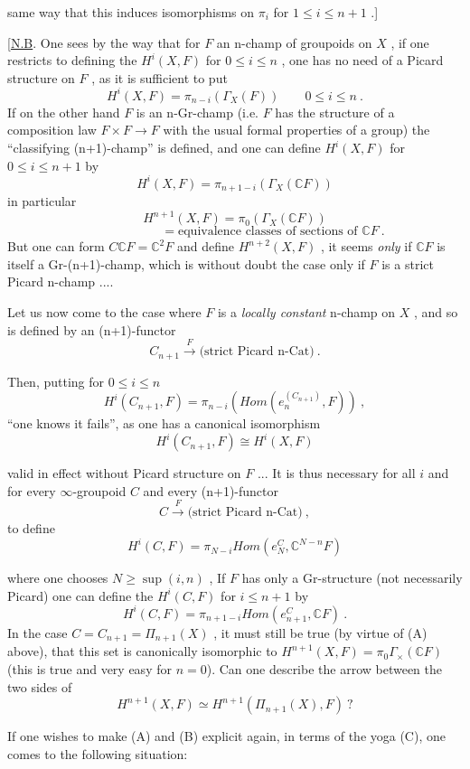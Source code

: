 
same way that this induces isomorphisms on $\pi_i$ for $1 \leq i \leq n + 1$ .]

[\uline{N.B}. One sees by the way that for $F$ an n-champ of groupoids on $X$ ,
if one restricts to defining the $H^i(X, F)$ for $0 \leq i \leq n$ , one has no need
of a Picard structure on $F$ , as it is sufficient to put
\[ H^i(X, F) = \pi_{n-i}(\Gamma_X(F)) \qquad 0 \leq i \leq n \ . \]
If on the other hand $F$ is an n-Gr-champ (i.e. $F$ has the structure of a
composition law $F \times F \rightarrow F$ with the usual formal properties of a group) the
``classifying (n+1)-champ'' is defined, and one can define $H^i(X, F)$ for
$0 \leq i \leq n + 1$ by
\[ H^i(X, F) = \pi_{n+1-i}(\Gamma_X(\mathbb{C}F)) \]
in particular
\[ H^{n+1}(X, F) = \pi_0(\Gamma_X(\mathbb{C}F)) \]
\[ \hspace{6em} = \text{equivalence classes of sections of } \mathbb{C}F \ . \]
But one can form $C\mathbb{C}F = \mathbb{C}^2F$ and define $H^{n+2}(X, F)$ , it seems \textit{only} if $\mathbb{C}F$
is itself a Gr-(n+1)-champ, which is without doubt the case only if $F$ is
a strict Picard n-champ ....

Let us now come to the case where $F$ is a \textit{locally constant} n-champ on
$X$ , and so is defined by an (n+1)-functor
\[ C_{n+1} \xrightarrow{F} \text{(strict Picard n-Cat)} \ . \]

Then, putting for $0 \leq i \leq n$
\[ H^i(C_{n+1}, F) = \pi_{n-i}(\mathit{Hom}(e_n^{(C_{n+1})}, F)) \ , \]
``one knows it fails'', as one has a canonical isomorphism
\[ H^i(C_{n+1}, F) \cong H^i(X, F) \]

valid in effect without Picard structure on $F$ ... It is thus necessary
for all $i$ and for every $\infty$-groupoid $C$ and every (n+1)-functor
\[ C \xrightarrow{F} \text{(strict Picard n-Cat)} \ , \]
to define
\[ H^i(C, F) = \pi_{N-i}\mathit{Hom}(e_N^C, \mathbb{C}^{N-n}F) \]

where one chooses $N \geq \sup(i, n)$ , If $F$ has only a Gr-structure (not
necessarily Picard) one can define the $H^i(C, F)$ for $i \leq n + 1$ by
\[ H^i(C, F) = \pi_{n+1-i}\mathit{Hom}(e^C_{n+1}, \mathbb{C}F) \ . \]
In the case $C = C_{n+1} = \Pi_{n+1}(X)$ , it must still be true (by virtue of (A)
above), that this set is canonically isomorphic to $H^{n+1}(X, F) = \pi_0\Gamma_{\times}(\mathbb{C}F)$
(this is true and very easy for $n = 0$). Can one describe the arrow
between the two sides of
\[ H^{n+1}(X, F) \simeq H^{n+1}(\Pi_{n+1}(X), F) \ ? \]

If one wishes to make (A) and (B) explicit again, in terms of the yoga
(C), one comes to the following situation:

